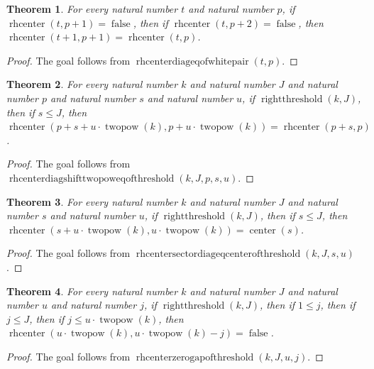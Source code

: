 \documentclass[11pt]{article}
\newtheorem{theorem}{Theorem}[section]
\theoremstyle{definition}
\begin{document}
\begin{theorem}
\label{ll:paper:rhcenter-diag-eq-of-white-pair}
For every natural number \(t\) and natural number \(p\), if \(\operatorname{rhcenter}(t, p + 1) = \operatorname{false}\), then if \(\operatorname{rhcenter}(t, p + 2) = \operatorname{false}\), then \(\operatorname{rhcenter}(t + 1, p + 1) = \operatorname{rhcenter}(t, p)\).
\end{theorem}
\begin{proof}
The goal follows from \(\operatorname{rhcenterdiageqofwhitepair}(t, p)\).
\end{proof}
\begin{theorem}
\label{ll:paper:rhcenter-diag-shift-twopow-eq-of-threshold}
For every natural number \(k\) and natural number \(J\) and natural number \(p\) and natural number \(s\) and natural number \(u\), if \(\operatorname{rightthreshold}(k, J)\), then if \(s \le J\), then \(\operatorname{rhcenter}(p + s + u \cdot \operatorname{twopow}(k), p + u \cdot \operatorname{twopow}(k)) = \operatorname{rhcenter}(p + s, p)\).
\end{theorem}
\begin{proof}
The goal follows from \(\operatorname{rhcenterdiagshifttwopoweqofthreshold}(k, J, p, s, u)\).
\end{proof}
\begin{theorem}
\label{ll:paper:rhcenter-sector-diag-eq-center-of-threshold}
For every natural number \(k\) and natural number \(J\) and natural number \(s\) and natural number \(u\), if \(\operatorname{rightthreshold}(k, J)\), then if \(s \le J\), then \(\operatorname{rhcenter}(s + u \cdot \operatorname{twopow}(k), u \cdot \operatorname{twopow}(k)) = \operatorname{center}(s)\).
\end{theorem}
\begin{proof}
The goal follows from \(\operatorname{rhcentersectordiageqcenterofthreshold}(k, J, s, u)\).
\end{proof}
\begin{theorem}
\label{ll:paper:rhcenter-zero-gap-of-threshold}
For every natural number \(k\) and natural number \(J\) and natural number \(u\) and natural number \(j\), if \(\operatorname{rightthreshold}(k, J)\), then if \(1 \le j\), then if \(j \le J\), then if \(j \le u \cdot \operatorname{twopow}(k)\), then \(\operatorname{rhcenter}(u \cdot \operatorname{twopow}(k), u \cdot \operatorname{twopow}(k) - j) = \operatorname{false}\).
\end{theorem}
\begin{proof}
The goal follows from \(\operatorname{rhcenterzerogapofthreshold}(k, J, u, j)\).
\end{proof}
\end{document}
